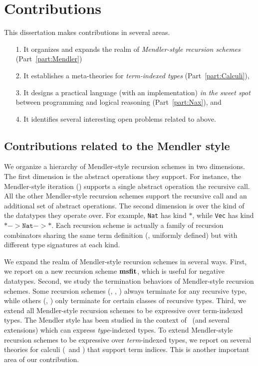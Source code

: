\section{Contributions}\label{APP:sec:intro:contrib}
This dissertation makes contributions in several areas.
\begin{itemize}
\item[1.]
    It organizes and expands the realm of \emph{Mendler-style recursion schemes}
    (Part~\ref{part:Mendler})

\item[2.] It establishes a meta-theories for \emph{term-indexed types}
        (Part~\ref{part:Calculi}),

\item[3.] It designs a practical language (with an implementation)
        \emph{in the sweet spot} between programming and logical reasoning
        (Part~\ref{part:Nax}), and

\item[4.] It identifies several interesting open problems related to above.
\end{itemize}

\subsection{Contributions related to the Mendler style}
We organize a hierarchy of Mendler-style recursion schemes in two dimensions.
The first dimension is the abstract operations they support. For instance,
the Mendler-style iteration (\MIt) supports a single abstract operation
the recursive call. All the other Mendler-style recursion schemes
support the recursive call and an additional set of abstract operations. 
The second dimension is over the kind of the datatypes they operate over.
For example, \texttt{Nat} has kind $*$, while \texttt{Vec}
has kind $* -> \mathtt{Nat} -> *$. Each recursion scheme is actually a
family of recursion combinators sharing the same term definition
(\ie, uniformly defined) but with different type signatures at each kind.

We expand the realm of Mendler-style recursion schemes in several ways.
First, we report on a new recursion scheme $\mathbf{msfit}$, which is useful
for negative datatypes.  Second, we study the termination behaviors
of Mendler-style recursion schemes. Some recursion schemes (\eg, \MIt, \MsfIt)
always terminate for any recursive type, while others (\eg, \McvPr) only
terminate for certain classes of recursive types. Third, we extend
all Mendler-style recursion schemes to be expressive over term-indexed types.
The Mendler style has been studied in the context of \Fw\ (and several
extensions) which can express \emph{type}-indexed types. To extend Mendler-style
recursion schemes to be expressive over \emph{term}-indexed types, we report on
several theories for calculi (\Fi\ and \Fixi) that support term indices.
This is another important area of our contribution.

